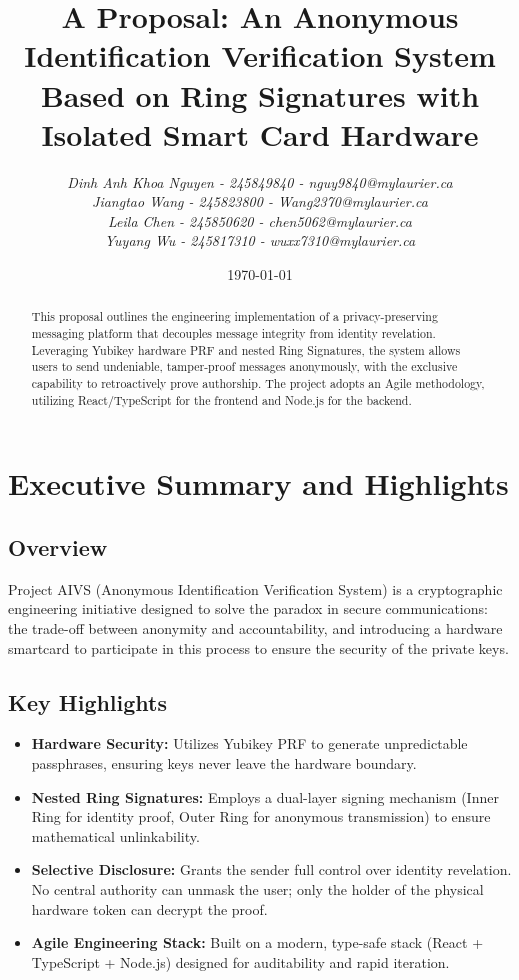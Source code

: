 \documentclass[letterpaper,11pt]{article}
\title{\textbf{A Proposal: An Anonymous Identification Verification System}\\Based on Ring Signatures with Isolated Smart Card Hardware}
\author{
\textit{Dinh Anh Khoa Nguyen - 245849840 - nguy9840@mylaurier.ca}\\
\textit{Jiangtao Wang - 245823800 - Wang2370@mylaurier.ca}\\
\textit{Leila Chen - 245850620 - chen5062@mylaurier.ca}\\
\textit{Yuyang Wu - 245817310 - wuxx7310@mylaurier.ca}\\
}
\date{\today}
\begin{document}
\maketitle
\thispagestyle{empty}

\begin{abstract}
This proposal outlines the engineering implementation of a privacy-preserving messaging platform that decouples message integrity from identity revelation. Leveraging Yubikey hardware PRF and nested Ring Signatures, the system allows users to send undeniable, tamper-proof messages anonymously, with the exclusive capability to retroactively prove authorship. The project adopts an Agile methodology, utilizing React/TypeScript for the frontend and Node.js for the backend.
\end{abstract}
\newpage

\tableofcontents
\newpage

\section{Executive Summary and Highlights}

\subsection{Overview}
Project AIVS (Anonymous Identification Verification System) is a cryptographic engineering initiative designed to solve the paradox in secure communications: the trade-off between anonymity and accountability, and introducing a hardware smartcard to participate in this process to ensure the security of the private keys.
\subsection{Key Highlights}
\begin{itemize}
    \item \textbf{Hardware Security:} Utilizes Yubikey PRF to generate unpredictable passphrases, ensuring keys never leave the hardware boundary.
    \item \textbf{Nested Ring Signatures:} Employs a dual-layer signing mechanism (Inner Ring for identity proof, Outer Ring for anonymous transmission) to ensure mathematical unlinkability.
    \item \textbf{Selective Disclosure:} Grants the sender full control over identity revelation. No central authority can unmask the user; only the holder of the physical hardware token can decrypt the proof.
    \item \textbf{Agile Engineering Stack:} Built on a modern, type-safe stack (React + TypeScript + Node.js) designed for auditability and rapid iteration.
\end{itemize}
\end{document}
